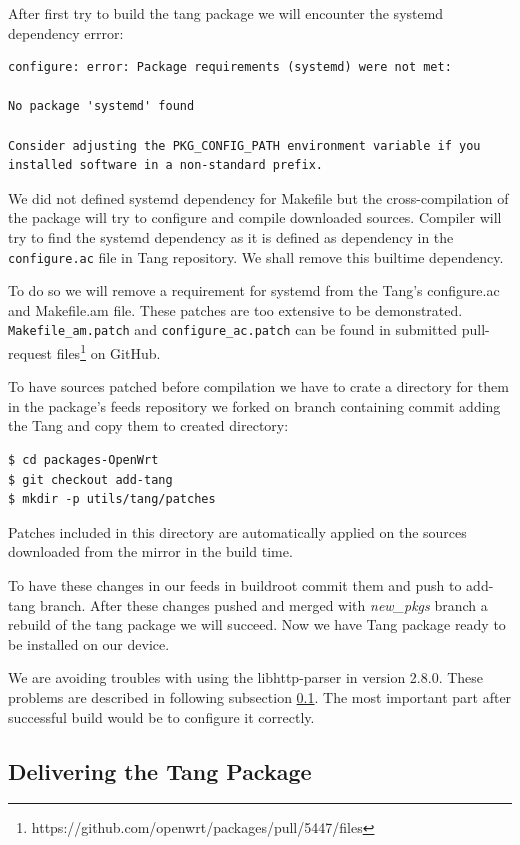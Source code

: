 After first try to build the tang package we will encounter the systemd dependency errror:
\begin{lstlisting}[columns=fixed,basicstyle=\ttfamily\footnotesize,tabsize=4,backgroundcolor=\color{yellow!10}]
configure: error: Package requirements (systemd) were not met:

No package 'systemd' found

Consider adjusting the PKG_CONFIG_PATH environment variable if you
installed software in a non-standard prefix.
\end{lstlisting}
We did not defined systemd dependency for Makefile but the cross-compilation of the package will try to configure and compile downloaded sources.
Compiler will try to find the systemd dependency as it is defined as dependency in the {\tt configure.ac} file in Tang repository.
We shall remove this builtime dependency.

To do so we will remove a requirement for systemd from the Tang's configure.ac and Makefile.am file.
These patches are too extensive to be demonstrated.
{\tt Makefile\_am.patch} and {\tt configure\_ac.patch} can be found in submitted pull-request files\footnote{https://github.com/openwrt/packages/pull/5447/files} on GitHub.

To have sources patched before compilation we have to crate a directory for them in the package's feeds repository we forked on branch containing commit adding the Tang and copy them to created directory:
\begin{lstlisting}[columns=fixed,basicstyle=\ttfamily\footnotesize,tabsize=4,backgroundcolor=\color{yellow!10}]
$ cd packages-OpenWrt
$ git checkout add-tang
$ mkdir -p utils/tang/patches
\end{lstlisting}
Patches included in this directory are automatically applied on the sources downloaded from the mirror in the build time.

To have these changes in our feeds in buildroot commit them and push to add-tang branch.
After these changes pushed and merged with {\it new\_pkgs} branch a rebuild of the tang package we will succeed.
Now we have Tang package ready to be installed on our device.

We are avoiding troubles with using the libhttp-parser in version 2.8.0.
These problems are described in following subsection \ref{porting_problems}.
The most important part after successful build would be to configure it correctly.



\subsection{Delivering the Tang Package}\label{porting_problems}

